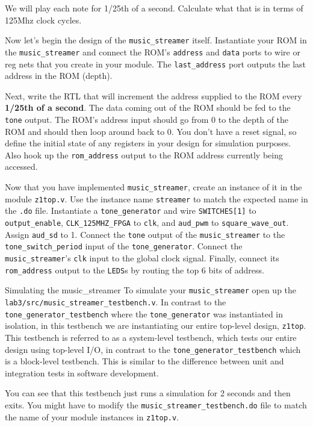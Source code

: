 \documentclass[11pt]{article}
\makeatletter
\renewcommand{\section}
{\@startsection {section}{1}{0pt}
 {-2ex}
 {1ex}
 {\bfseries\Large}}
\makeatother
\begin{document}
We will play each note for 1/25th of a second. Calculate what that is in terms of 125Mhz clock cycles.

Now let's begin the design of the \verb|music_streamer| itself. Instantiate your ROM in the \verb|music_streamer| and connect the ROM's \verb|address| and \verb|data| ports to wire or reg nets that you create in your module.  The \verb|last_address| port outputs the last address in the ROM (depth).

Next, write the RTL that will increment the address supplied to the ROM every \textbf{1/25th of a second}. The data coming out of the ROM should be fed to the \verb|tone| output. The ROM's address input should go from 0 to the depth of the ROM and should then loop around back to 0. You don't have a reset signal, so define the initial state of any registers in your design for simulation purposes. Also hook up the \verb|rom_address| output to the ROM address currently being accessed.

Now that you have implemented \verb|music_streamer|, create an instance of it in the module \verb|z1top.v|. Use the instance name \verb|streamer| to match the expected name in the \verb|.do| file. Instantiate a \verb|tone_generator| and wire \verb|SWITCHES[1]| to \verb|output_enable|, \verb|CLK_125MHZ_FPGA| to \verb|clk|, and \verb|aud_pwm| to \verb|square_wave_out|.  Assign \verb|aud_sd| to 1.  Connect the \verb|tone| output of the \verb|music_streamer| to the \verb|tone_switch_period| input of the \verb|tone_generator|. Connect the \verb|music_streamer|'s \verb|clk| input to the global clock signal. Finally, connect  its \verb|rom_address| output to the \verb|LEDS|s by routing the top 6 bits of address.

\section{Simulating the music\_streamer}
To simulate your \verb|music_streamer| open up the \verb|lab3/src/music_streamer_testbench.v|. In contrast to the \verb|tone_generator_testbench| where the \verb|tone_generator| was instantiated in isolation, in this testbench we are instantiating our entire top-level design, \verb|z1top|. This testbench is referred to as a system-level testbench, which tests our entire design using top-level I/O, in contrast to the \verb|tone_generator_testbench| which is a block-level testbench. This is similar to the difference between unit and integration tests in software development.

You can see that this testbench just runs a simulation for 2 seconds and then exits. You might have to modify the \verb|music_streamer_testbench.do| file to match the name of your module instances in \verb|z1top.v|.
\end{document}

